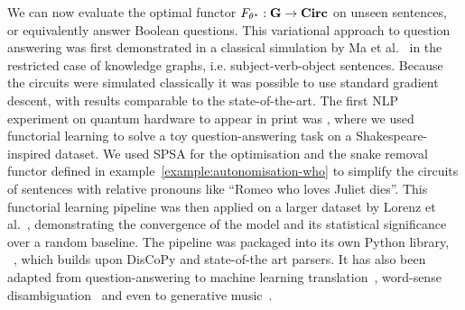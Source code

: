 We can now evaluate the optimal functor $F_{\theta^\star} : \mathbf{G} \to \mathbf{Circ}$ on unseen sentences, or equivalently answer Boolean questions.
This variational approach to question answering was first demonstrated in a classical simulation by Ma et al.~\cite{MaEtAl19} in the restricted case of knowledge graphs, i.e. subject-verb-object sentences.
Because the circuits were simulated classically it was possible to use standard gradient descent, with results comparable to the state-of-the-art.
The first NLP experiment on quantum hardware to appear in print was \cite{MeichanetzidisEtAl20}, where we used functorial learning to solve a toy question-answering task on a Shakespeare-inspired dataset.
We used SPSA for the optimisation and the snake removal functor defined in example~\ref{example:autonomisation-who} to simplify the circuits of sentences with relative pronouns like ``Romeo who loves Juliet dies''.
This functorial learning pipeline was then applied on a larger dataset by Lorenz et al.~\cite{LorenzEtAl21}, demonstrating the convergence of the model and its statistical significance over a random baseline.
The pipeline was packaged into its own Python library, ~\cite{KartsaklisEtAl21}, which builds upon DisCoPy and state-of-the art parsers.
It has also been adapted from question-answering to machine learning translation~\cite{AbbaszadeEtAl21,VicenteNieto21}, word-sense disambiguation~\cite{Hoffmann21} and even to generative music~\cite{MirandaEtAl21}.
